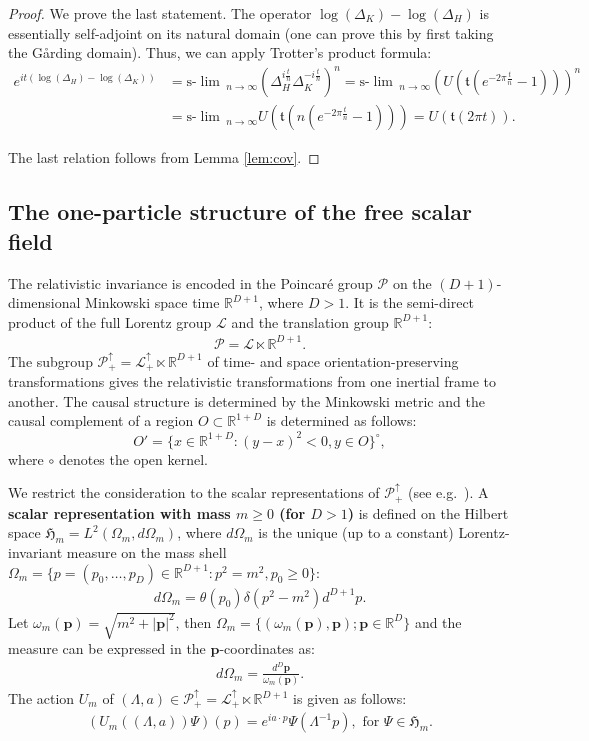 \documentclass[12pt]{article}
\def\RR{{\mathbb R}}
\def\P{{\mathcal P}}
\def\hm{\mathfrak{H}_m}
\def\slim{{{\mathrm{s}\textrm{-}\lim}\,}}
\def\poincare{{\P^\uparrow_+}}
\def\tp{\pmb{p}}
\theoremstyle{remark}
\begin{document}
\begin{proof}
	We prove the last statement. The operator $\log(\Delta_K)- \log(\Delta_H)$ is essentially self-adjoint on its natural domain
	(one can prove this by first taking the G\aa rding domain). Thus, we can apply Trotter's product formula:
		\begin{align*}
			e^{it(\log(\Delta_H)-\log(\Delta_K))}&=\slim_{n \rightarrow \infty}\left(\Delta_H^{i\frac{t}{n}}\Delta_K^{-i\frac{t}{n}}  \right)^n
			= \slim_{n\rightarrow \infty}\left(U(\mathfrak{t}(e^{-2\pi \frac{t}{n}}-1))  \right)^n \\
			&=\slim_{n\rightarrow \infty}U\left(\mathfrak{t}(n(e^{-2\pi \frac{t}{n}}-1))\right) =U(\mathfrak{t}(2\pi t)). 
		\end{align*}
		
    The last relation follows from Lemma \ref{lem:cov}.
\end{proof}




\subsection{The one-particle structure of the free scalar field }\label{sec:oneparticle}
The relativistic invariance is encoded in the Poincar\'e group $\P$ on the $(D+1)$-dimensional Minkowski space time $\RR^{D+1}$,
where $D>1$.
It is the semi-direct product of the full Lorentz group $\mathcal{L}$ and the translation group $\RR^{D+1}$:
\begin{align*}
 \P=\mathcal{L}\ltimes \RR^{D+1}.
\end{align*}
The subgroup $\poincare = \mathcal{L}^\uparrow_+\ltimes \RR^{D+1}$ of time- and space orientation-preserving transformations gives the relativistic transformations
from one inertial frame to another. The causal structure is determined by the Minkowski metric and the causal complement of a region $O\subset\RR^{1+D}$ is determined as follows:
$$O'=\{x\in\RR^{1+D}:(y-x)^2<0, y\in O\}^\circ,$$
where $\circ$ denotes the open kernel.

We restrict the consideration to the scalar representations of $\poincare$ (see e.g.~\cite{Var85}).
A \textbf{scalar representation with mass $m \ge 0$ (for $D>1$)} is defined on the Hilbert space $\hm = L^2(\Omega_m,d\Omega_m)$,
where $d\Omega_m$ is the unique (up to a constant) Lorentz-invariant measure on the mass shell $\Omega_m=\{p=(p_0,\ldots,p_D)\in\RR^{D+1}: p^2=m^2, p_0\geq0\}$: 
\begin{align*}d\Omega_m=\theta(p_0)\delta(p^2-m^2)d^{D+1}p. \end{align*}
Let $\omega_m(\tp)=\sqrt{m^2+|\tp|^2}$, then
$\Omega_m=\{(\omega_m(\tp),\tp); \tp\in \RR^{D}\}$ 
and the measure can be expressed in the $\tp$-coordinates as: 
\begin{align}
 d\Omega_m=
 \frac{d^{D}\tp}{\omega_m(\tp)}. \label{eq:omegam}
\end{align}
The action $U_m$ of $(\Lambda,a)\in \poincare = \mathcal{L}^\uparrow_+\ltimes \RR^{D+1}$ is given as follows:
\begin{align}
 (U_m((\Lambda,a))\Psi)(p)=e^{ia\cdot p}\Psi(\Lambda^{-1}p), \text{ for } \Psi \in \hm. \label{poincare-action}
\end{align}
\end{document}
